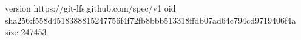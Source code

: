 version https://git-lfs.github.com/spec/v1
oid sha256:f558d4518388815247756f4f72fb8bbb513318ffdb07ad64c794cd9719406f4a
size 247453
